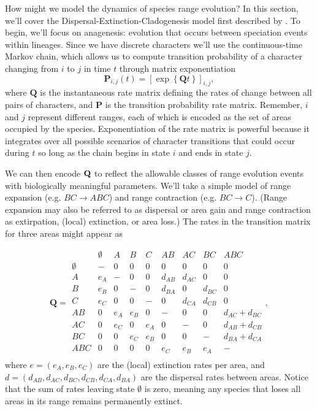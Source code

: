How might we model the dynamics of species range evolution?
In this section, we'll cover the Dispersal-Extinction-Cladogenesis model first described by \citet{Ree2005}.
To begin, we'll focus on anagenesis: evolution that occurs between speciation events within lineages.
Since we have discrete characters we'll use the continuous-time Markov chain, which allows us to compute transition probability of a character changing from $i$ to $j$ in time $t$ through matrix exponentiation
\[
\mathbf{P}_{i,j}(t) = \left[ \exp \left\lbrace \mathbf{Q}t \right\rbrace \right]_{i,j},
\]
where $\textbf{Q}$ is the instantaneous rate matrix defining the rates of change between all pairs of characters, and $\textbf{P}$ is the transition probability rate matrix.
Remember, $i$ and $j$ represent different ranges, each of which is encoded as the set of areas occupied by the species.
Exponentiation of the rate matrix is powerful because it integrates over all possible scenarios of character transitions that could occur during $t$ so long as the chain begins in state $i$ and ends in state $j$.

We can then encode ${\bf Q}$ to reflect the allowable classes of range evolution events with biologically meaningful parameters.
We'll take a simple model of range expansion (e.g. $BC \rightarrow ABC$) and range contraction (e.g. $BC \rightarrow C$).
(Range expansion may also be referred to as dispersal or area gain and range contraction as extirpation, (local) extinction, or area loss.)
The rates in the transition matrix for three areas might appear as

\[
\textbf{Q} = 
	\begin{array}{c|cccccccc}
		& \emptyset & A & B & C & AB & AC & BC & ABC \\
		\hline
		\emptyset 	& - 	& 0 	& 0 	& 0 		& 0			& 0 		& 0 		& 0 \\
		A 			& e_A 	& - 	& 0 	& 0 		& d_{AB}	& d_{AC} 	& 0 		& 0 \\
		B 			& e_B 	& 0 	& - 	& 0 		& d_{BA}	& 0 		& d_{BC} 	& 0 \\
		C 			& e_C 	& 0 	& 0 	& - 		& 0 		& d_{CA} 	& d_{CB} 	& 0 \\
		AB 			& 0 	& e_A 	& e_B 	& 0 		& -			& 0 		& 0 		& d_{AC} + d_{BC} \\
		AC 			& 0 	& e_C 	& 0 	& e_A 		& 0			& - 		& 0 		& d_{AB} + d_{CB} \\
		BC 			& 0 	& 0 	& e_C 	& e_B 		& 0			& 0 		& - 		& d_{BA} + d_{CA} \\
		ABC 		& 0 	& 0 	& 0 	& 0 		& e_C 		& e_B 		& e_A 		& - \\								
	\end{array},
\]
where $e = ( e_A, e_B, e_C )$ are the (local) extinction rates per area, and $d = ( d_{AB}, d_{AC}, d_{BC}, d_{CB}, d_{CA}, d_{BA})$ are the dispersal rates between areas.
Notice that the sum of rates leaving state $\emptyset$ is zero, meaning any species that loses all areas in its range remains permanently extinct.


